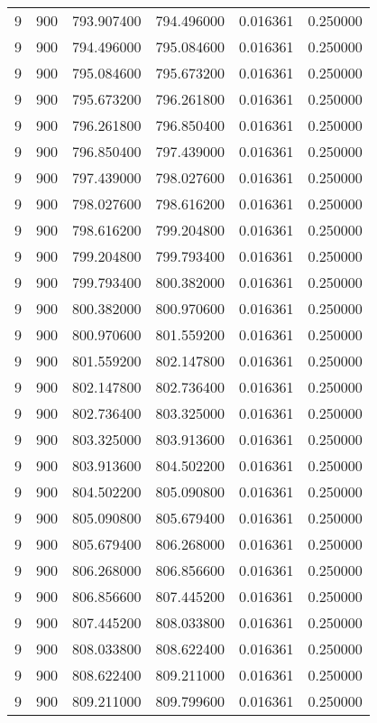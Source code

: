\begin{longtable}{rrrrrr}
9 & 900 & 793.907400 & 794.496000 & 0.016361 & 0.250000 \\
9 & 900 & 794.496000 & 795.084600 & 0.016361 & 0.250000 \\
9 & 900 & 795.084600 & 795.673200 & 0.016361 & 0.250000 \\
9 & 900 & 795.673200 & 796.261800 & 0.016361 & 0.250000 \\
9 & 900 & 796.261800 & 796.850400 & 0.016361 & 0.250000 \\
9 & 900 & 796.850400 & 797.439000 & 0.016361 & 0.250000 \\
9 & 900 & 797.439000 & 798.027600 & 0.016361 & 0.250000 \\
9 & 900 & 798.027600 & 798.616200 & 0.016361 & 0.250000 \\
9 & 900 & 798.616200 & 799.204800 & 0.016361 & 0.250000 \\
9 & 900 & 799.204800 & 799.793400 & 0.016361 & 0.250000 \\
9 & 900 & 799.793400 & 800.382000 & 0.016361 & 0.250000 \\
9 & 900 & 800.382000 & 800.970600 & 0.016361 & 0.250000 \\
9 & 900 & 800.970600 & 801.559200 & 0.016361 & 0.250000 \\
9 & 900 & 801.559200 & 802.147800 & 0.016361 & 0.250000 \\
9 & 900 & 802.147800 & 802.736400 & 0.016361 & 0.250000 \\
9 & 900 & 802.736400 & 803.325000 & 0.016361 & 0.250000 \\
9 & 900 & 803.325000 & 803.913600 & 0.016361 & 0.250000 \\
9 & 900 & 803.913600 & 804.502200 & 0.016361 & 0.250000 \\
9 & 900 & 804.502200 & 805.090800 & 0.016361 & 0.250000 \\
9 & 900 & 805.090800 & 805.679400 & 0.016361 & 0.250000 \\
9 & 900 & 805.679400 & 806.268000 & 0.016361 & 0.250000 \\
9 & 900 & 806.268000 & 806.856600 & 0.016361 & 0.250000 \\
9 & 900 & 806.856600 & 807.445200 & 0.016361 & 0.250000 \\
9 & 900 & 807.445200 & 808.033800 & 0.016361 & 0.250000 \\
9 & 900 & 808.033800 & 808.622400 & 0.016361 & 0.250000 \\
9 & 900 & 808.622400 & 809.211000 & 0.016361 & 0.250000 \\
9 & 900 & 809.211000 & 809.799600 & 0.016361 & 0.250000 \\

\end{longtable}
